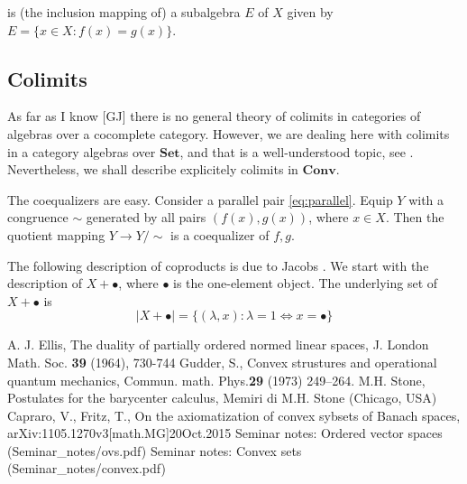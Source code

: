 \documentclass[12pt,letterpaper]{article}
\newcommand{\ct}[1]{\mathbf{#1}}
\newcommand{\<}{\langle}
\begin{document}
is (the inclusion mapping of) a subalgebra $E$ of $X$ given by
$E=\{x\in X\colon f(x)=g(x)\}$.

\subsection{Colimits}

As far as I know [GJ] there is no general theory of colimits in categories of algebras over a
cocomplete category. However, we are dealing here with colimits in a category algebras over $\ct{Set}$, and
that is a well-understood topic, see \cite{...}. Nevertheless, we shall 
describe explicitely colimits
in $\ct{Conv}$. 

The coequalizers are easy. Consider a parallel pair \ref{eq:parallel}. Equip
$Y$ with a congruence $\sim$ generated by all pairs $(f(x),g(x))$, where $x\in X$.
Then the quotient mapping $Y\to Y/\sim$ is a coequalizer of $f,g$.

The following description of coproducts is due to Jacobs \cite{...}. We start with the
description of $X+\bullet$, where $\bullet$ is the one-element object. The underlying
set of $X+\bullet$ is
$$
|X+\bullet|=\{(\lambda,x)\colon \lambda=1\Leftrightarrow x=\bullet\}
$$

\begin{thebibliography}{WWW}
 A. J. Ellis, The duality of partially ordered normed linear spaces, J. London Math. Soc. \textbf{39} (1964), 730-744
 Gudder, S., Convex strustures and operational quantum mechanics, Commun. math. Phys.{\bf 29} (1973) 249--264.
 M.H. Stone, Postulates for the barycenter calculus, Memiri di M.H. Stone (Chicago, USA)
 Capraro, V., Fritz, T., On the axiomatization of convex sybsets of Banach spaces, arXiv:1105.1270v3[math.MG]20Oct.2015
 Seminar notes: Ordered vector spaces (Seminar\_notes/ovs.pdf)
 Seminar notes: Convex sets (Seminar\_notes/convex.pdf)

\end{thebibliography}
\end{document}
